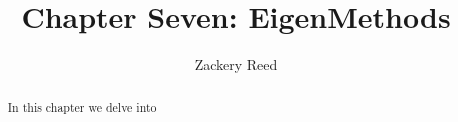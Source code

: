 \documentclass{xourse}
\title{Chapter Seven: EigenMethods}
\author{Zackery Reed}
\begin{document}
\begin{abstract}
    In this chapter we delve into 
\end{abstract}
\maketitle

\end{document}
